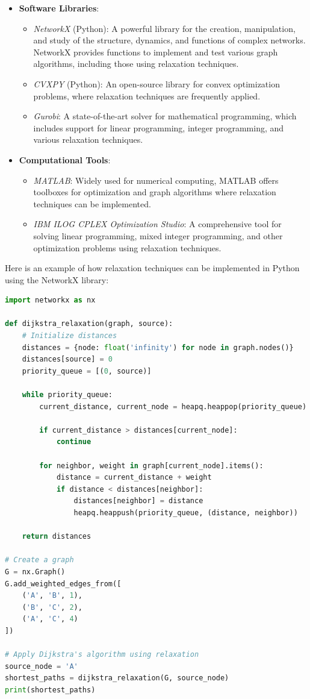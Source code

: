 \documentclass[12pt]{book} %
\begin{document}
\begin{itemize}
    \item \textbf{Software Libraries}:
        \begin{itemize}
            \item \textit{NetworkX} (Python): A powerful library for the creation, manipulation, and study of the structure, dynamics, and functions of complex networks. NetworkX provides functions to implement and test various graph algorithms, including those using relaxation techniques.
            \item \textit{CVXPY} (Python): An open-source library for convex optimization problems, where relaxation techniques are frequently applied.
            \item \textit{Gurobi}: A state-of-the-art solver for mathematical programming, which includes support for linear programming, integer programming, and various relaxation techniques.
        \end{itemize}
    \item \textbf{Computational Tools}:
        \begin{itemize}
            \item \textit{MATLAB}: Widely used for numerical computing, MATLAB offers toolboxes for optimization and graph algorithms where relaxation techniques can be implemented.
            \item \textit{IBM ILOG CPLEX Optimization Studio}: A comprehensive tool for solving linear programming, mixed integer programming, and other optimization problems using relaxation techniques.
        \end{itemize}
\end{itemize}

Here is an example of how relaxation techniques can be implemented in Python using the NetworkX library:

\FloatBarrier
\begin{lstlisting}[language=Python, caption=Relaxation technique for shortest path using Dijkstra's algorithm]
import networkx as nx

def dijkstra_relaxation(graph, source):
    # Initialize distances
    distances = {node: float('infinity') for node in graph.nodes()}
    distances[source] = 0
    priority_queue = [(0, source)]

    while priority_queue:
        current_distance, current_node = heapq.heappop(priority_queue)

        if current_distance > distances[current_node]:
            continue

        for neighbor, weight in graph[current_node].items():
            distance = current_distance + weight
            if distance < distances[neighbor]:
                distances[neighbor] = distance
                heapq.heappush(priority_queue, (distance, neighbor))

    return distances

# Create a graph
G = nx.Graph()
G.add_weighted_edges_from([
    ('A', 'B', 1),
    ('B', 'C', 2),
    ('A', 'C', 4)
])

# Apply Dijkstra's algorithm using relaxation
source_node = 'A'
shortest_paths = dijkstra_relaxation(G, source_node)
print(shortest_paths)
\end{lstlisting}
\FloatBarrier
\end{document}

